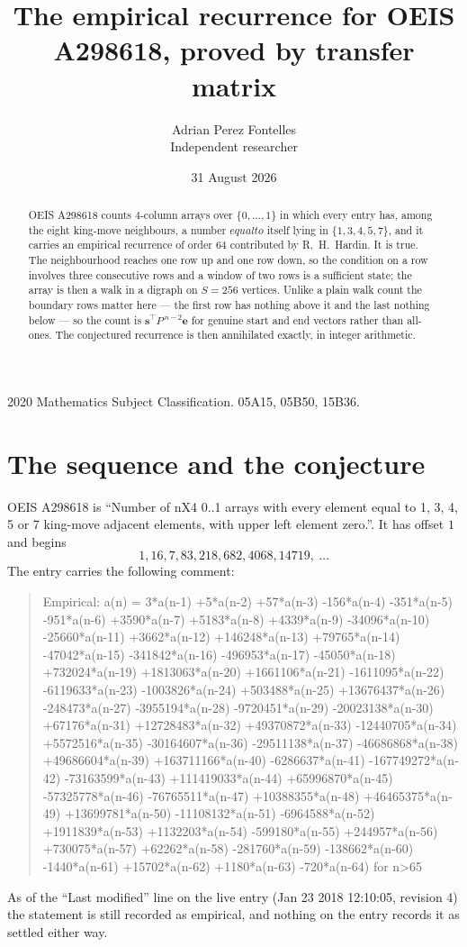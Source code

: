 \documentclass[11pt,a4paper]{article}
\title{The empirical recurrence for OEIS A298618, proved by transfer matrix}
\author{Adrian Perez Fontelles\\ \small Independent researcher}
\date{31 August 2026}
\theoremstyle{plain}
\theoremstyle{definition}
\begin{document}
\maketitle

\begin{abstract}
OEIS A298618 counts $4$-column arrays over $\{0,\dots,1\}$ in which every entry has,
among the eight king-move neighbours, a number $equal to$ itself lying in $\{1,3,4,5,7\}$, and it carries an empirical
recurrence of order $64$ contributed by R.~H.~Hardin. It is true. The neighbourhood
reaches one row up and one row down, so the condition on a row involves three consecutive
rows and a window of two rows is a sufficient state; the array is then a walk in a digraph
on $S=256$ vertices. Unlike a plain walk count the boundary rows matter here --- the first
row has nothing above it and the last nothing below --- so the count is
$\mathbf{s}^{\!\top}P^{\,n-2}\mathbf{e}$ for genuine start and end vectors rather than
all-ones. The conjectured recurrence is then annihilated exactly, in integer arithmetic.
\end{abstract}

\noindent\small 2020 Mathematics Subject Classification. 05A15, 05B50, 15B36.\normalsize

\section{The sequence and the conjecture}

OEIS A298618 is ``Number of nX4 0..1 arrays with every element equal to 1, 3, 4, 5 or 7 king-move adjacent elements, with upper left element zero.''. It has offset
$1$ and begins
\[
1, 16, 7, 83, 218, 682, 4068, 14719,\ \dots
\]
The entry carries the following comment:
\begin{quote}\small
Empirical: a(n) = 3*a(n-1) +5*a(n-2) +57*a(n-3) -156*a(n-4) -351*a(n-5) -951*a(n-6) +3590*a(n-7) +5183*a(n-8) +4339*a(n-9) -34096*a(n-10) -25660*a(n-11) +3662*a(n-12) +146248*a(n-13) +79765*a(n-14) -47042*a(n-15) -341842*a(n-16) -496953*a(n-17) -45050*a(n-18) +732024*a(n-19) +1813063*a(n-20) +1661106*a(n-21) -1611095*a(n-22) -6119633*a(n-23) -1003826*a(n-24) +503488*a(n-25) +13676437*a(n-26) -248473*a(n-27) -3955194*a(n-28) -9720451*a(n-29) -20023138*a(n-30) +67176*a(n-31) +12728483*a(n-32) +49370872*a(n-33) -12440705*a(n-34) +5572516*a(n-35) -30164607*a(n-36) -29511138*a(n-37) -46686868*a(n-38) +49686604*a(n-39) +163711166*a(n-40) -6286637*a(n-41) -167749272*a(n-42) -73163599*a(n-43) +111419033*a(n-44) +65996870*a(n-45) -57325778*a(n-46) -76765511*a(n-47) +10388355*a(n-48) +46465375*a(n-49) +13699781*a(n-50) -11108132*a(n-51) -6964588*a(n-52) +1911839*a(n-53) +1132203*a(n-54) -599180*a(n-55) +244957*a(n-56) +730075*a(n-57) +62262*a(n-58) -281760*a(n-59) -138662*a(n-60) -1440*a(n-61) +15702*a(n-62) +1180*a(n-63) -720*a(n-64) for n>65
\end{quote}
As of the ``Last modified'' line on the live entry (Jan 23 2018 12:10:05, revision
4) the statement is still recorded as empirical, and nothing on the entry
records it as settled either way.
\end{document}
